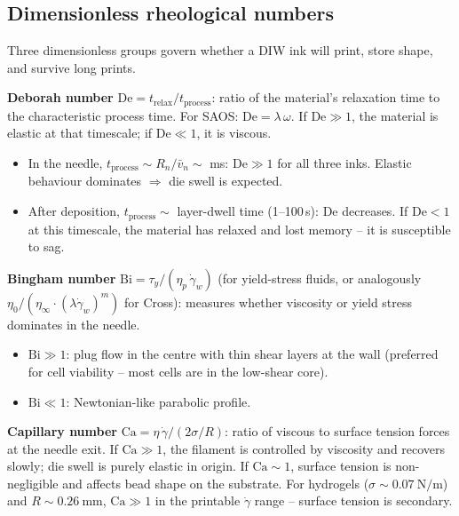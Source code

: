 \documentclass[11pt,a4paper]{article}
\newcommand{\gd}{\dot{\gamma}}
\newcommand{\Bi}{\mathrm{Bi}}
\newcommand{\De}{\mathrm{De}}
\newcommand{\Ca}{\mathrm{Ca}}
\begin{document}
\subsection{Dimensionless rheological numbers}
\label{sec:dimless_rheo}

Three dimensionless groups govern whether a DIW ink will print, store
shape, and survive long prints.

\begin{dimensionlessbox}
\textbf{Deborah number} $\De = t_\mathrm{relax}/t_\mathrm{process}$:
ratio of the material's relaxation time to the characteristic process
time. For SAOS: $\De = \lambda\,\omega$. If $\De\gg 1$, the material
is elastic at that timescale; if $\De\ll 1$, it is viscous.

\begin{itemize}[leftmargin=1.4em,itemsep=2pt]
\item In the needle, $t_\mathrm{process}\sim R_n/\bar v_n\sim$ ms:
  $\De\gg 1$ for all three inks. Elastic behaviour dominates $\Rightarrow$
  die swell is expected.
\item After deposition, $t_\mathrm{process}\sim$ layer-dwell time
  (1--100\,\si{\s}): $\De$ decreases. If $\De<1$ at this timescale,
  the material has relaxed and lost memory -- it is susceptible to sag.
\end{itemize}

\textbf{Bingham number} $\Bi = \tau_y / (\eta_p\,\gd_w)$ (for yield-stress
fluids, or analogously $\eta_0/(\eta_\infty\cdot(\lambda\gd_w)^m)$ for
Cross): measures whether viscosity or yield stress dominates in the
needle.
\begin{itemize}[leftmargin=1.4em,itemsep=1pt]
\item $\Bi\gg 1$: plug flow in the centre with thin shear layers at the
  wall (preferred for cell viability -- most cells are in the low-shear
  core).
\item $\Bi\ll 1$: Newtonian-like parabolic profile.
\end{itemize}

\textbf{Capillary number} $\Ca = \eta\,\gd / (2\sigma/R)$: ratio of
viscous to surface tension forces at the needle exit. If $\Ca\gg 1$,
the filament is controlled by viscosity and recovers slowly; die swell
is purely elastic in origin. If $\Ca\sim 1$, surface tension is
non-negligible and affects bead shape on the substrate.
For hydrogels ($\sigma\sim\SI{0.07}{\N\per\m}$) and
$R\sim\SI{0.26}{\mm}$, $\Ca\gg 1$ in the printable $\gd$ range --
surface tension is secondary.
\end{dimensionlessbox}
\end{document}
